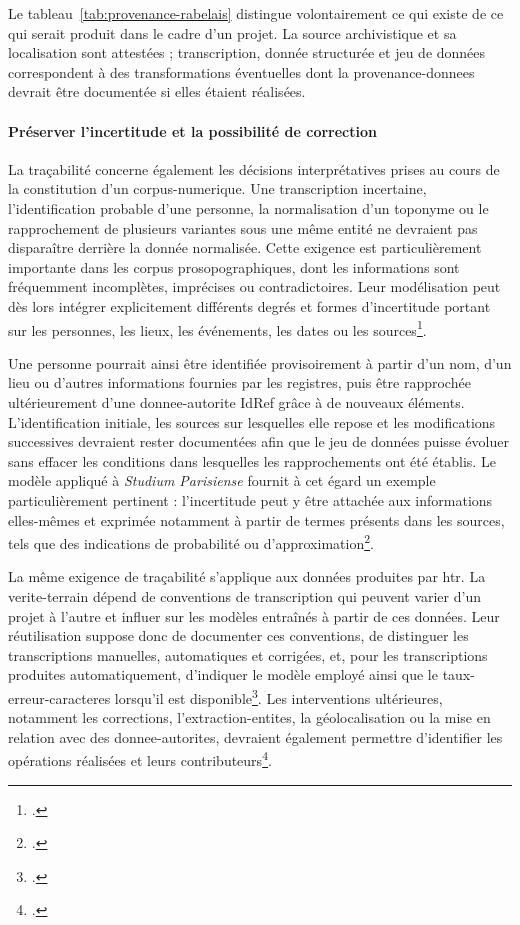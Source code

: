 Le tableau~\ref{tab:provenance-rabelais} distingue volontairement ce qui existe de ce qui serait produit dans le cadre d'un projet. La source archivistique et sa localisation sont attestées ; transcription, donnée structurée et jeu de données correspondent à des transformations éventuelles dont la \gls{provenance-donnees} devrait être documentée si elles étaient réalisées.

\paragraph{Préserver l'incertitude et la possibilité de correction}

La traçabilité concerne également les décisions interprétatives prises au cours de la constitution d'un \gls{corpus-numerique}. Une transcription incertaine, l'identification probable d'une personne, la normalisation d'un toponyme ou le rapprochement de plusieurs variantes sous une même entité ne devraient pas disparaître derrière la donnée normalisée. Cette exigence est particulièrement importante dans les corpus prosopographiques, dont les informations sont fréquemment incomplètes, imprécises ou contradictoires. Leur modélisation peut dès lors intégrer explicitement différents degrés et formes d'incertitude portant sur les personnes, les lieux, les événements, les dates ou les sources\footcite{AkokaComynWattiauLamasseDuMouza2019}.

Une personne pourrait ainsi être identifiée provisoirement à partir d'un nom, d'un lieu ou d'autres informations fournies par les registres, puis être rapprochée ultérieurement d'une \gls{donnee-autorite} IdRef grâce à de nouveaux éléments. L'identification initiale, les sources sur lesquelles elle repose et les modifications successives devraient rester documentées afin que le jeu de données puisse évoluer sans effacer les conditions dans lesquelles les rapprochements ont été établis. Le modèle appliqué à \emph{Studium Parisiense} fournit à cet égard un exemple particulièrement pertinent : l'incertitude peut y être attachée aux informations elles-mêmes et exprimée notamment à partir de termes présents dans les sources, tels que des indications de probabilité ou d'approximation\footcite{AkokaComynWattiauLamasseDuMouza2019}.

La même exigence de traçabilité s'applique aux données produites par \gls{htr}. La \gls{verite-terrain} dépend de conventions de transcription qui peuvent varier d'un projet à l'autre et influer sur les modèles entraînés à partir de ces données. Leur réutilisation suppose donc de documenter ces conventions, de distinguer les transcriptions manuelles, automatiques et corrigées, et, pour les transcriptions produites automatiquement, d'indiquer le modèle employé ainsi que le \gls{taux-erreur-caracteres} lorsqu'il est disponible\footcite{RomeinEtAl2024DataProvenance}. Les interventions ultérieures, notamment les corrections, l'\gls{extraction-entites}, la géolocalisation ou la mise en relation avec des \glspl{donnee-autorite}, devraient également permettre d'identifier les opérations réalisées et leurs contributeurs\footcite{RomeinEtAl2024DataProvenance}.


